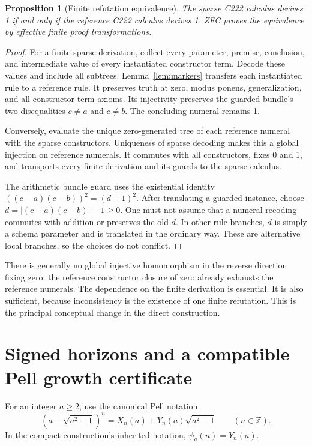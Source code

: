 \documentclass[11pt,letterpaper]{article}
\newtheorem{proposition}[theorem]{Proposition}
\theoremstyle{remark}\newtheorem{remark}[theorem]{Remark}
\newcommand{\Z}{\mathbb Z}\newcommand{\N}{\mathbb N}
\begin{document}
\begin{proposition}[Finite refutation equivalence]\label{prop:recoding}
The sparse C222 calculus derives 1 if and only if the reference C222
calculus derives 1. ZFC proves the equivalence by effective finite proof
transformations.
\end{proposition}
\begin{proof}
For a finite sparse derivation, collect every parameter, premise,
conclusion, and intermediate value of every instantiated constructor
term. Decode these values and include all subtrees. Lemma~\ref{lem:markers}
transfers each instantiated rule to a reference rule. It preserves truth
at zero, modus ponens, generalization, and all constructor-term axioms.
Its injectivity preserves the guarded bundle's two disequalities
$c\ne a$ and $c\ne b$. The concluding numeral remains 1.

Conversely, evaluate the unique zero-generated tree of each reference
numeral with the sparse constructors. Uniqueness of sparse decoding
makes this a global injection on reference numerals. It commutes with
all constructors, fixes 0 and 1, and transports every finite derivation
and its guards to the sparse calculus.

The arithmetic bundle guard uses the existential identity
$((c-a)(c-b))^2=(d+1)^2$. After translating a guarded instance, choose
$d=|(c-a)(c-b)|-1\ge0$. One must not assume that a numeral recoding
commutes with addition or preserves the old $d$. In other rule branches,
$d$ is simply a schema parameter and is translated in the ordinary way.
These are alternative local branches, so the choices do not conflict.
\end{proof}

There is generally no global injective homomorphism in the reverse
direction fixing zero: the reference constructor closure of zero already
exhausts the reference numerals. The dependence on the finite derivation
is essential. It is also sufficient, because inconsistency is the
existence of one finite refutation. This is the principal conceptual
change in the direct construction.

\section{Signed horizons and a compatible Pell growth certificate}
\label{sec:growth}

For an integer $a\ge2$, use the canonical Pell notation
\[
 (a+\sqrt{a^2-1})^n=X_n(a)+Y_n(a)\sqrt{a^2-1}
 \qquad(n\in\Z).
\]
In the compact construction's inherited notation, $\psi_a(n)=Y_n(a)$.
\end{document}
